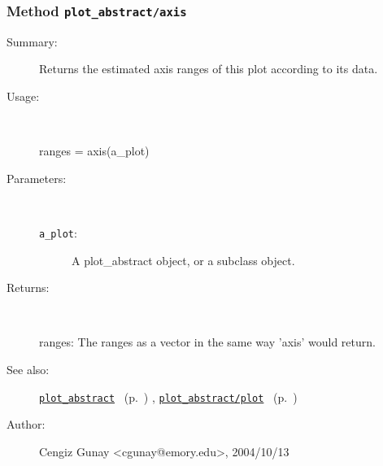 \subsubsection[Method \texttt{axis}]{Method \texttt{plot\_abstract/axis}}%
%
\label{ref_plot_abstract__axis}%
\hypertarget{ref_plot_abstract__axis}{}%
\begin{description}
\item[Summary:]Returns the estimated axis ranges of this plot according to its data.
%
\item[Usage:]~%
\begin{lyxcode}%
ranges = axis(a\_plot)
%
\end{lyxcode}%
%
%
\item[Parameters:]~
\begin{description}%
\item[\texttt{a\_plot}:]
 A plot\_abstract object, or a subclass object.
\end{description}%
%
\item[Returns:]~

	ranges: The ranges as a vector in the same way 'axis' would return.
%
%
\item[See also:]%
\hyperlink{ref_plot_abstract}{\texttt{plot\_abstract}}%
\ (p.~\pageref{ref_plot_abstract})%
%
, \hyperlink{ref_plot_abstract__plot}{\texttt{plot\_abstract/plot}}%
\ (p.~\pageref{ref_plot_abstract__plot})%
%
%
\item[Author:]%
Cengiz Gunay <cgunay@emory.edu>, 2004/10/13%
\end{description}
\methodline%
